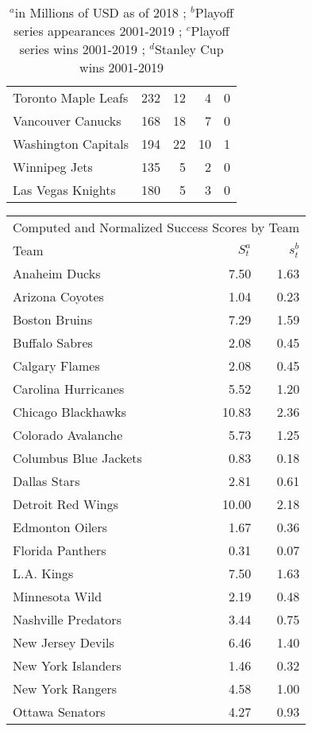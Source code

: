 \documentclass[11pt]{report}            %
\begin{document}
\begin{table}[ht]
\begin{tabular}{lrrrr}
Toronto Maple Leafs & 232 &  12 &   4 &   0 \\ 
Vancouver Canucks & 168 &  18 &   7 &   0 \\ 
Washington Capitals & 194 &  22 &  10 &   1 \\ 
Winnipeg Jets & 135 &   5 &   2 &   0 \\ 
Las Vegas Knights & 180 &   5 &   3 &   0 \\ 
\hline
\end{tabular}
\caption{$^a$in Millions of USD as of 2018 \cite{money}; $^b$Playoff series appearances 2001-2019 \cite{stats}; $^c$Playoff series wins 2001-2019 \cite{stats}; $^d$Stanley Cup wins 2001-2019 \cite{stats}}
\label{table:Revenue}
\end{table}

\begin{table}[ht]
\centering
\begin{tabular}{lrr}
\hline
\multicolumn{3}{c}{Computed and Normalized Success Scores by Team} \\
Team & $S_t^a$ & $s_t^b$ \\ 
\hline
Anaheim Ducks & 7.50 & 1.63 \\ 
Arizona Coyotes & 1.04 & 0.23 \\ 
Boston Bruins & 7.29 & 1.59 \\ 
Buffalo Sabres & 2.08 & 0.45 \\ 
Calgary Flames & 2.08 & 0.45 \\ 
Carolina Hurricanes & 5.52 & 1.20 \\ 
Chicago Blackhawks & 10.83 & 2.36 \\ 
Colorado Avalanche & 5.73 & 1.25 \\ 
Columbus Blue Jackets & 0.83 & 0.18 \\ 
Dallas Stars & 2.81 & 0.61 \\ 
Detroit Red Wings & 10.00 & 2.18 \\ 
Edmonton Oilers & 1.67 & 0.36 \\ 
Florida Panthers & 0.31 & 0.07 \\ 
L.A. Kings & 7.50 & 1.63 \\ 
Minnesota Wild & 2.19 & 0.48 \\ 
Nashville Predators & 3.44 & 0.75 \\ 
New Jersey Devils & 6.46 & 1.40 \\ 
New York Islanders & 1.46 & 0.32 \\ 
New York Rangers & 4.58 & 1.00 \\ 
Ottawa Senators & 4.27 & 0.93 \\ 

\end{tabular}
\end{table}
\end{document}
